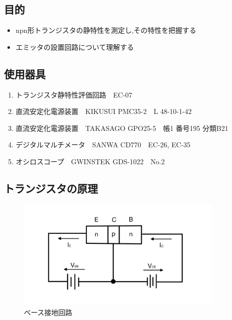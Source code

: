 \documentclass[titlepage]{jarticle}
\begin{document}
\subsection{目的}
\begin{itemize}
    \item npn形トランジスタの静特性を測定し,その特性を把握する
    \item エミッタの設置回路について理解する
\end{itemize}
\subsection{使用器具}
\begin{enumerate}
    \item トランジスタ静特性評価回路　EC-07
    \item 直流安定化電源装置　KIKUSUI PMC35-2　L 48-10-1-42
    \item 直流安定化電源装置　TAKASAGO GPO25-5　帳1 番号195 分類B21
    \item デジタルマルチメータ　SANWA CD770　EC-26, EC-35
    \item オシロスコープ　GWINSTEK GDS-1022　No.2
\end{enumerate}

\subsection{トランジスタの原理}
\begin{figure}[H]
    \begin{center}
        \includegraphics[width=10cm]{image/tr.jpg}
        \caption{ベース接地回路}
        \label{fig:ベース接地回路}
    \end{center}
\end{figure}
\end{document}
